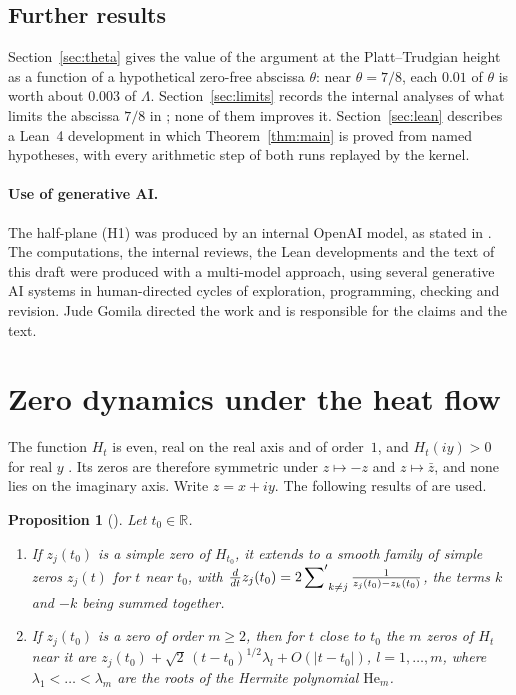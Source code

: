 \documentclass[11pt]{article}
\newtheorem{proposition}[theorem]{Proposition}
\theoremstyle{definition}
\newcommand{\LB}{\Lambda}
\newcommand{\R}{\mathbb{R}}
\begin{document}
\subsection{Further results}

Section~\ref{sec:theta} gives the value of the argument at the Platt--Trudgian height as a
function of a hypothetical zero-free abscissa $\theta$: near $\theta=7/8$, each $0.01$
of $\theta$ is worth about $0.003$ of $\LB$. Section~\ref{sec:limits} records the
internal analyses of what limits the abscissa $7/8$ in \cite{OpenAI26QRH}; none of them
improves it. Section~\ref{sec:lean} describes a Lean~4 development in which
Theorem~\ref{thm:main} is proved from named hypotheses, with every arithmetic step of
both runs replayed by the kernel.

\paragraph{Use of generative AI.}
The half-plane (H1) was produced by an internal OpenAI model, as stated in
\cite{OpenAI26QRH}. The computations, the internal reviews, the Lean developments and
the text of this draft were produced with a multi-model approach, using several
generative AI systems in human-directed cycles of exploration, programming, checking
and revision.
Jude Gomila directed the work and is responsible for the claims and the text.

\section{Zero dynamics under the heat flow}\label{sec:dynamics}

The function $H_t$ is even, real on the real axis and of order~$1$, and $H_t(iy)>0$ for
real $y$ \cite[Section~3]{Polymath19}. Its zeros are therefore symmetric under
$z\mapsto-z$ and $z\mapsto\bar z$, and none lies on the imaginary axis. Write
$z=x+iy$. The following results of \cite{Polymath19} are used.

\begin{proposition}[{\cite[Proposition~3.1]{Polymath19}}]\label{prop:dyn}
Let $t_0\in\R$.
\begin{enumerate}[label=\textup{(\roman*)},leftmargin=2.2em]
\item If $z_j(t_0)$ is a simple zero of $H_{t_0}$, it extends to a smooth family of simple
zeros $z_j(t)$ for $t$ near $t_0$, with
$\frac{d}{dt}z_j(t_0)=2\sideset{}{'}\sum_{k\ne j}\frac1{z_j(t_0)-z_k(t_0)}$, the terms
$k$ and $-k$ being summed together.
\item If $z_j(t_0)$ is a zero of order $m\ge2$, then for $t$ close to $t_0$ the $m$ zeros
of $H_t$ near it are
$z_j(t_0)+\sqrt2\,(t-t_0)^{1/2}\lambda_l+O(|t-t_0|)$, $l=1,\dots,m$, where
$\lambda_1<\dots<\lambda_m$ are the roots of the Hermite polynomial $\mathrm{He}_m$.
\end{enumerate}
\end{proposition}
\end{document}
